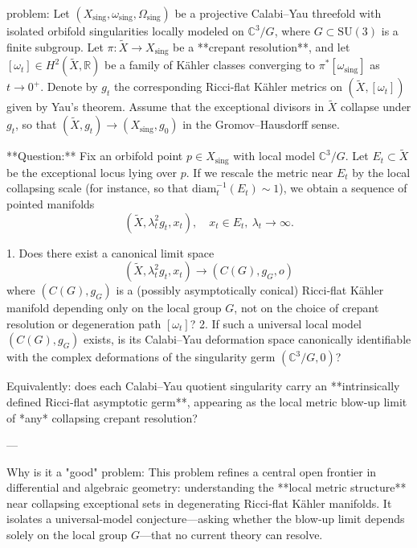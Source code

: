 problem:  
Let \( (X_{\mathrm{sing}}, \omega_{\mathrm{sing}}, \Omega_{\mathrm{sing}}) \) be a projective Calabi–Yau threefold with isolated orbifold singularities locally modeled on \( \mathbb{C}^3 / G \), where \( G \subset \mathrm{SU}(3) \) is a finite subgroup.  
Let \( \pi : \widetilde{X} \to X_{\mathrm{sing}} \) be a **crepant resolution**, and let \( [\omega_t] \in H^2(\widetilde{X}, \mathbb{R}) \) be a family of Kähler classes converging to \( \pi^*[\omega_{\mathrm{sing}}] \) as \( t \to 0^+ \).  
Denote by \( g_t \) the corresponding Ricci‑flat Kähler metrics on \( (\widetilde{X}, [\omega_t]) \) given by Yau’s theorem.  
Assume that the exceptional divisors in \( \widetilde{X} \) collapse under \( g_t \), so that \( (\widetilde{X}, g_t) \to (X_{\mathrm{sing}}, g_0) \) in the Gromov–Hausdorff sense.

**Question:**  
Fix an orbifold point \( p \in X_{\mathrm{sing}} \) with local model \( \mathbb{C}^3 / G \).  
Let \( E_t \subset \widetilde{X} \) be the exceptional locus lying over \( p \).  
If we rescale the metric near \( E_t \) by the local collapsing scale (for instance, so that \( \mathrm{diam}_{t}^{-1}(E_t) \sim 1 \)), we obtain a sequence of pointed manifolds  
\[
(\widetilde{X}, \lambda_t^2 g_t, x_t), \quad x_t \in E_t, \ \lambda_t \to \infty.
\]

1. Does there exist a canonical limit space  
   \[
   (\widetilde{X}, \lambda_t^2 g_t, x_t) \longrightarrow (C(G), g_G, o)
   \]
   where \((C(G), g_G)\) is a (possibly asymptotically conical) Ricci‑flat Kähler manifold depending only on the local group \(G\), not on the choice of crepant resolution or degeneration path \([\omega_t]\)?  
2. If such a universal local model \((C(G), g_G)\) exists, is its Calabi–Yau deformation space canonically identifiable with the complex deformations of the singularity germ \((\mathbb{C}^3 / G, 0)\)?  

Equivalently: does each Calabi–Yau quotient singularity carry an **intrinsically defined Ricci‑flat asymptotic germ**, appearing as the local metric blow‑up limit of *any* collapsing crepant resolution?

---

Why is it a "good" problem:  
This problem refines a central open frontier in differential and algebraic geometry: understanding the **local metric structure** near collapsing exceptional sets in degenerating Ricci‑flat Kähler manifolds.  
It isolates a universal‑model conjecture—asking whether the blow‑up limit depends solely on the local group \(G\)—that no current theory can resolve.  

